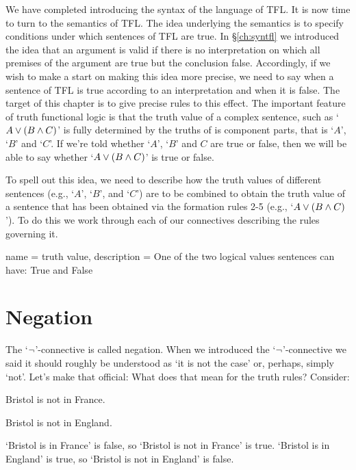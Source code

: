 We have completed introducing the syntax of the language of TFL. It is now time to turn to the semantics of TFL. The idea underlying the semantics is to specify conditions under which sentences of TFL are true. In \S\ref{ch:syntfl} we introduced the idea that an argument is valid if there is no interpretation on which all premises of the argument are true but the conclusion false. Accordingly, if we wish to make a start on making this idea more precise, we need to say when a sentence of TFL is true according to an interpretation and when it is false. The target of this chapter is to give precise rules to this effect. The important feature of truth functional logic is that the truth value of a complex sentence, such as `$A\vee(B\mathbin{\wedge} C)$' is fully determined by the truths of is component parts, that is `$A$', `$B$' and `$C$'. If we're told whether `$A$', `$B$' and $C$ are true or false, then we will be able to say whether `$A\vee(B\mathbin{\wedge} C)$' is true or false.

To spell out this idea, we need to describe how the truth values of different sentences (e.g., `$A$', `$B$', and `$C$') are to be combined to obtain the truth value of a sentence  that has been obtained via the formation rules 2-5 (e.g., `$A\vee(B\mathbin{\wedge} C)$'). To do this we work through each of our connectives describing the rules governing it.

{
	name = truth value,
	description = {One of the two logical values sentences can have: True and False}
}


\section{Negation}
The `$\neg$'-connective is called negation. When we introduced the `$\neg$'-connective we said it should roughly be understood as `it is not the case' or, perhaps, simply `not'. Let's make that official:
What does that mean for the truth rules? Consider:
\begin{earg}
\item[\ex{neg-f}] Bristol is not in France.
\item[\ex{neg-f}] Bristol is not in England.
\end{earg}
`Bristol is in France' is false, so `Bristol is not in France' is true.
`Bristol is in England' is true, so `Bristol is not in England' is false.

